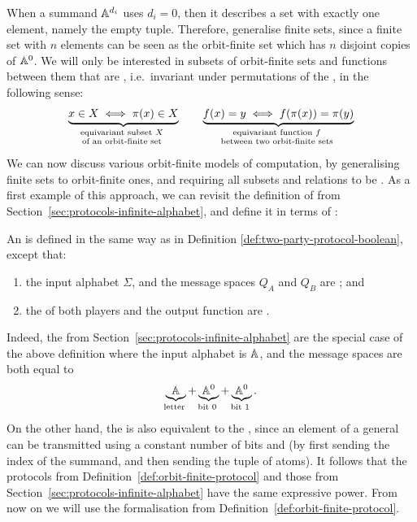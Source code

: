 \AP
When a summand $\mathbb A^{d_i}$ uses $d_i =0$, then it  describes a set with
exactly one element, namely the empty tuple. Therefore, 
generalise finite sets, since a  finite set with $n$ elements can be seen as
the orbit-finite set which has $n$ disjoint copies of $\mathbb A^0$. We will only
be interested in subsets of orbit-finite sets and functions between them that
are , i.e.~invariant under permutations of the , in
the following sense:
\begin{align*}
\myunderbrace{x \in X \iff \pi(x) \in X}{equivariant subset $X$ \\ of an orbit-finite set}
\qquad 
\myunderbrace{f(x) = y \iff f(\pi(x)) = \pi(y)}{equivariant function $f$ \\ between two orbit-finite sets}
\end{align*}
We can now discuss various orbit-finite models of computation, by generalising
finite sets to orbit-finite ones, and requiring all subsets and relations to be
. As a first example of this approach, we can revisit the definition
of  from Section~\ref{sec:protocols-infinite-alphabet}, and
define it in terms of :

\begin{definition}
    \label{def:orbit-finite-protocol}
    An 
    is defined in the same way as in Definition \ref{def:two-party-protocol-boolean}, except that:
  \begin{enumerate}
    \item the input alphabet $\Sigma$, and the message spaces $Q_A$ and $Q_B$ are ; and 
    \item the  of both players and the output function are .
  \end{enumerate}
\end{definition}

Indeed, the  from
Section~\ref{sec:protocols-infinite-alphabet} are the special case of the above
definition where the input alphabet is $\mathbb A$, and the message spaces are
both equal to 
\begin{align*}
\myunderbrace{\atoms}{letter} + \myunderbrace{\atoms^0}{bit 0} + \myunderbrace{\atoms^0}{bit 1}.
\end{align*}
On the other hand, the  is also
equivalent to the , since an element of a general 
can be transmitted using a constant number of bits and  (by first sending
the index of the summand, and then sending the tuple of atoms). It follows that
the protocols from Definition~\ref{def:orbit-finite-protocol} and those from
Section~\ref{sec:protocols-infinite-alphabet} have the same expressive power.
From now on we will use the formalisation from
Definition~\ref{def:orbit-finite-protocol}.

